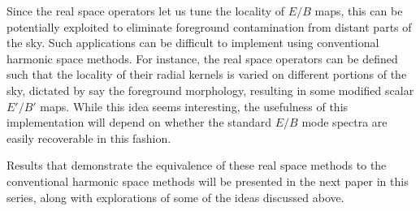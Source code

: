 
  

Since the real space operators let us tune the locality of $E/B$ maps, this can be potentially exploited to eliminate foreground contamination from distant parts of the sky. Such applications can be difficult to implement using conventional harmonic space methods.  For instance, the real space operators can be defined such that the locality of their radial kernels is varied on different portions of the sky, dictated by say the foreground morphology, resulting in some modified scalar $E'/B'$ maps.  While this idea seems interesting, the usefulness of this implementation will depend on whether the standard $E/B$ mode spectra are easily recoverable in this fashion.  

Results that demonstrate the equivalence of these real space methods to the conventional harmonic space methods will be presented in the next paper in this series, along with explorations of some of the ideas discussed above.

